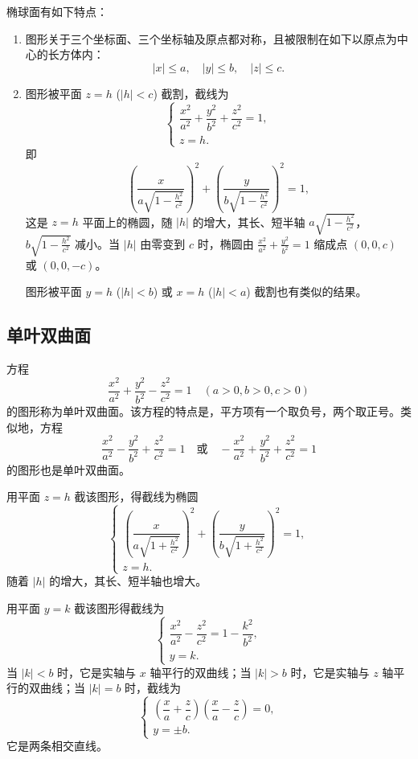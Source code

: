 椭球面有如下特点：
\begin{enumerate}
    \item 图形关于三个坐标面、三个坐标轴及原点都对称，且被限制在如下以原点为中心的长方体内：
    \[
    |x| \leq a, \quad |y| \leq b, \quad |z| \leq c.
    \]
    \item 图形被平面 $z = h$ ($|h| < c$) 截割，截线为
    \[
    \begin{cases}
    \dfrac{x^2}{a^2} + \dfrac{y^2}{b^2} + \dfrac{z^2}{c^2} = 1, \\
    z = h.
    \end{cases}
    \]
    即
    \[
    \left( \frac{x}{a \sqrt{1 - \frac{h^2}{c^2}}} \right)^2 + \left( \frac{y}{b \sqrt{1 - \frac{h^2}{c^2}}} \right)^2 = 1,
    \]
    这是 $z = h$ 平面上的椭圆，随 $|h|$ 的增大，其长、短半轴 $a \sqrt{1 - \frac{h^2}{c^2}}$，$b \sqrt{1 - \frac{h^2}{c^2}}$ 减小。当 $|h|$ 由零变到 $c$ 时，椭圆由 $\frac{x^2}{a^2} + \frac{y^2}{b^2} = 1$ 缩成点 $(0, 0, c)$ 或 $(0, 0, -c)$。

    图形被平面 $y = h$ ($|h| < b$) 或 $x = h$ ($|h| < a$) 截割也有类似的结果。
\end{enumerate}

\subsection{单叶双曲面}
方程
\[
\frac{x^2}{a^2} + \frac{y^2}{b^2} - \frac{z^2}{c^2} = 1 \quad (a > 0, b > 0, c > 0)
\]
的图形称为单叶双曲面。该方程的特点是，平方项有一个取负号，两个取正号。类似地，方程
\[
\frac{x^2}{a^2} - \frac{y^2}{b^2} + \frac{z^2}{c^2} = 1 \quad \text{或} \quad -\frac{x^2}{a^2} + \frac{y^2}{b^2} + \frac{z^2}{c^2} = 1
\]
的图形也是单叶双曲面。

用平面 $z = h$ 截该图形，得截线为椭圆
\[
\begin{cases}
\left( \dfrac{x}{a \sqrt{1 + \frac{h^2}{c^2}}} \right)^2 + \left( \dfrac{y}{b \sqrt{1 + \frac{h^2}{c^2}}} \right)^2 = 1, \\
z = h.
\end{cases}
\]
随着 $|h|$ 的增大，其长、短半轴也增大。

用平面 $y = k$ 截该图形得截线为
\[
\begin{cases}
\dfrac{x^2}{a^2} - \dfrac{z^2}{c^2} = 1 - \dfrac{k^2}{b^2}, \\
y = k.
\end{cases}
\]
当 $|k| < b$ 时，它是实轴与 $x$ 轴平行的双曲线；当 $|k| > b$ 时，它是实轴与 $z$ 轴平行的双曲线；当 $|k| = b$ 时，截线为
\[
\begin{cases}
\left( \dfrac{x}{a} + \dfrac{z}{c} \right) \left( \dfrac{x}{a} - \dfrac{z}{c} \right) = 0, \\
y = \pm b.
\end{cases}
\]
它是两条相交直线。

